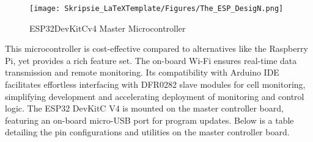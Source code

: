 \begin{figure}[h!]
\centering
\texttt{[image: Skripsie\_LaTeXTemplate/Figures/The\_ESP\_DesigN.png]}
\caption{ESP32DevKitCv4 Master Microcontroller \cite{The_ESP_ref}}
\label{fig:Mstr_D4}
\end{figure}
\noindent
This microcontroller is cost-effective compared to alternatives like the Raspberry Pi, yet provides a rich feature set. The on-board Wi-Fi ensures real-time data transmission and remote monitoring. Its compatibility with Arduino IDE facilitates effortless interfacing with DFR0282 slave modules for cell monitoring, simplifying development and accelerating deployment of monitoring and control logic. The ESP32 DevKitC V4 is mounted on the master controller board, featuring an on-board micro-USB port for program updates. Below is a table detailing the pin configurations and utilities on the master controller board.

